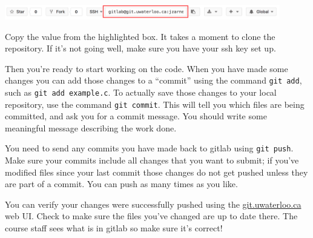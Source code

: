 \documentclass[letterpaper,10pt]{article}
\begin{document}
\begin{center}
	\includegraphics[width=0.9\textwidth]{images/gitlab-clone.png}
\end{center}

Copy the value from the highlighted box. It takes a moment to clone the repository. If it's not going well, make sure you have your ssh key set up. 

Then you're ready to start working on the code. When you have made some changes you can add those changes to a ``commit'' using the command \texttt{git add}, such as \texttt{git add example.c}. To actually save those changes to your local repository, use the command \texttt{git commit}. This will tell you which files are being committed, and ask you for a commit message. You should write some meaningful message describing the work done.

You need to send any commits you have made back to gitlab using \texttt{git push}. Make sure your commits include all changes that you want to submit; if you've modified files since your last commit those changes do not get pushed unless they are part of a commit. You can push as many times as you like.

You can verify your changes were successfully pushed using the \url{git.uwaterloo.ca} web UI. Check to make sure the files you've changed are up to date there. The course staff sees what is in gitlab so make sure it's correct!
\end{document}

